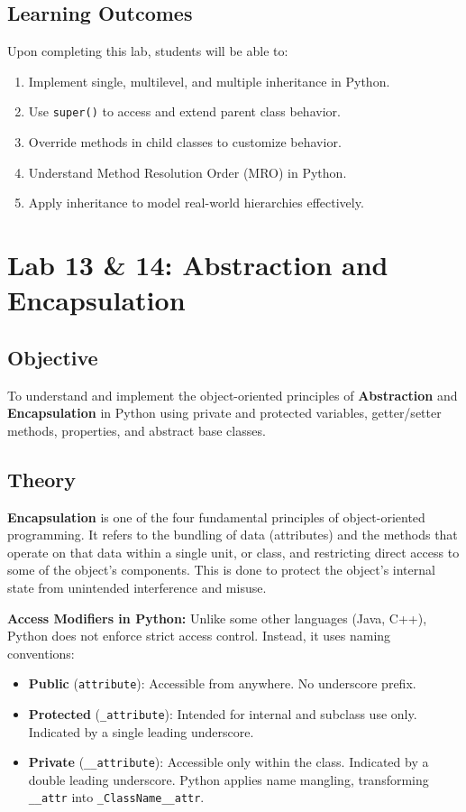 \documentclass[12pt,a4paper]{article}
\begin{document}
\subsection{Learning Outcomes}
Upon completing this lab, students will be able to:
\begin{enumerate}
  \item Implement single, multilevel, and multiple inheritance in Python.
  \item Use \texttt{super()} to access and extend parent class behavior.
  \item Override methods in child classes to customize behavior.
  \item Understand Method Resolution Order (MRO) in Python.
  \item Apply inheritance to model real-world hierarchies effectively.
\end{enumerate}

\newpage

\section{Lab 13 \& 14: Abstraction and Encapsulation}

\subsection{Objective}
To understand and implement the object-oriented principles of \textbf{Abstraction} and \textbf{Encapsulation} in Python using private and protected variables, getter/setter methods, properties, and abstract base classes.

\subsection{Theory}

\textbf{Encapsulation} is one of the four fundamental principles of object-oriented programming. It refers to the bundling of data (attributes) and the methods that operate on that data within a single unit, or class, and restricting direct access to some of the object's components. This is done to protect the object's internal state from unintended interference and misuse.

\textbf{Access Modifiers in Python:}
Unlike some other languages (Java, C++), Python does not enforce strict access control. Instead, it uses naming conventions:
\begin{itemize}
  \item \textbf{Public} (\texttt{attribute}): Accessible from anywhere. No underscore prefix.
  \item \textbf{Protected} (\texttt{\_attribute}): Intended for internal and subclass use only. Indicated by a single leading underscore.
  \item \textbf{Private} (\texttt{\_\_attribute}): Accessible only within the class. Indicated by a double leading underscore. Python applies name mangling, transforming \texttt{\_\_attr} into \texttt{\_ClassName\_\_attr}.
\end{itemize}
\end{document}
